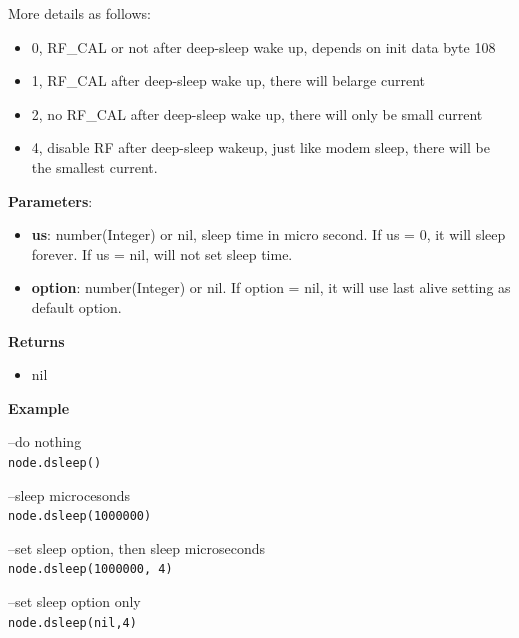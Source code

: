\documentclass[16pt]{article}
\begin{document}
More details as follows: 
\begin{itemize}
\item 0, RF\_CAL or not after deep-sleep wake up, depends on init data byte 108
\item 1, RF\_CAL after deep-sleep wake up, there will belarge current
\item 2, no RF\_CAL after deep-sleep wake up, there will only be small current 
\item 4, disable RF after deep-sleep wakeup, just like modem sleep, there will be the smallest current.
\end{itemize}

\textbf{Parameters}:

\begin{itemize}

\item
  \textbf{us}: number(Integer) or nil, sleep time in micro second. If us
  = 0, it will sleep forever. If us = nil, will not set sleep time.
\item
  \textbf{option}: number(Integer) or nil. If option = nil, it will use
  last alive setting as default option.
\end{itemize}

\textbf{Returns}

\begin{itemize}

\item
  nil
\end{itemize}

\textbf{Example}
\vspace{0.1cm}

--do nothing\\
\texttt{node.dsleep()}\\

\vspace{0.1cm}

--sleep microcesonds\\
\texttt{node.dsleep(1000000)}\\

\vspace{0.1cm}

--set sleep option, then sleep microseconds\\
\texttt{node.dsleep(1000000, 4)}\\

\vspace{0.1cm}

--set sleep option only\\
\texttt{node.dsleep(nil,4)}
\end{document}
